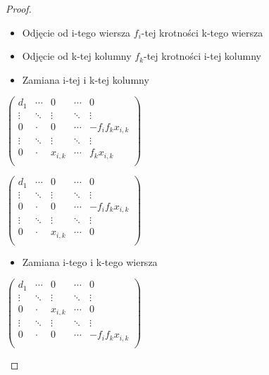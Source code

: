 \begin{proof}
\begin{itemize}
\item Odjęcie od i-tego wiersza $f_{i}$-tej krotności k-tego wiersza
\item Odjęcie od k-tej kolumny $f_{k}$-tej krotności i-tej kolumny
\item Zamiana i-tej i k-tej kolumny
\end{itemize}

\begin{minipage}{0.5\textwidth}
\begin{center}

			$\begin{pmatrix}
			d_{1} & \cdots & 0 & \cdots &0 \\
			\vdots & \ddots& \vdots & \ddots &\vdots\\
			0 & \cdot & 0 & \cdots & -f_{i}f_{k}x_{i,k}\\
			\vdots & \ddots& \vdots & \ddots &\vdots\\ 
			0 & \cdot & x_{i,k} & \cdots & f_{k}x_{i,k}\\			
			\end{pmatrix}$
			

\end{center}
\end{minipage}
\begin{minipage}{0.5\textwidth}
\begin{center}

			$\begin{pmatrix}
			d_{1} & \cdots & 0 & \cdots &0 \\
			\vdots & \ddots& \vdots & \ddots &\vdots\\
			0 & \cdot & 0 & \cdots & -f_{i}f_{k}x_{i,k}\\
			\vdots & \ddots& \vdots & \ddots &\vdots\\ 
			0 & \cdot & x_{i,k} & \cdots & 0\\			
			\end{pmatrix}$
			
\end{center}
\end{minipage}
\begin{itemize}
\item Zamiana i-tego i k-tego wiersza
\end{itemize}

\begin{center}

			$\begin{pmatrix}
			d_{1} & \cdots & 0 & \cdots &0 \\
			\vdots & \ddots& \vdots & \ddots &\vdots\\
			0 & \cdot & x_{i,k} & \cdots & 0\\
			\vdots & \ddots& \vdots & \ddots &\vdots\\ 
			0 & \cdot & 0 & \cdots & -f_{i}f_{k}x_{i,k}\\			
			\end{pmatrix}$
			

\end{center}
\end{proof}
